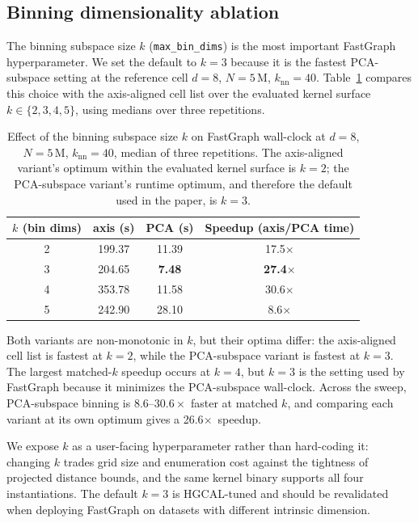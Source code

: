 \documentclass[final,3p,11pt]{elsarticle}
\newcommand{\fgcVanillaBestPCAfactor}{26.6\ensuremath{\times}}
\newcommand{\mbdOptPCA}{3}
\newcommand{\mbdOptAxis}{2}
\newcommand{\mbdPCAdefault}{3}
\begin{document}
\subsection{Binning dimensionality ablation}
\label{sec:mbd-ablation}

The binning subspace size $k$ (\texttt{max\_bin\_dims}) is the most
important FastGraph hyperparameter. We set the default to
$k{=}\mbdPCAdefault$ because it is the fastest PCA-subspace setting at
the reference cell $d{=}8$, $N{=}5$\,M, $k_{\text{nn}}{=}40$.
Table~\ref{tab:mbd-ablation} compares this choice with the
axis-aligned cell list over the evaluated kernel surface
$k \in \{2,3,4,5\}$, using medians over three repetitions.

\begin{table}[!htbp]
\centering
\caption{Effect of the binning subspace size $k$ on FastGraph
wall-clock at $d{=}8$, $N{=}5$\,M, $k_{\text{nn}}{=}40$, median of
three repetitions. The axis-aligned variant's optimum within
the evaluated kernel surface is $k{=}\mbdOptAxis$; the PCA-subspace
variant's runtime optimum, and therefore the default used in the
paper, is $k{=}\mbdOptPCA$.}
\label{tab:mbd-ablation}
\small
\begin{tabular}{cccc}
\toprule
$k$ (bin dims) & axis (s) & PCA (s) & Speedup (axis/PCA time) \\
\midrule
2 & 199.37 & 11.39 & 17.5$\times$ \\
3 & 204.65 &  \textbf{7.48} & \textbf{27.4}$\times$ \\
4 & 353.78 & 11.58 & 30.6$\times$ \\
5 & 242.90 & 28.10 &  8.6$\times$ \\
\bottomrule
\end{tabular}
\end{table}

Both variants are non-monotonic in $k$, but their optima differ: the
axis-aligned cell list is fastest at $k{=}\mbdOptAxis$, while the
PCA-subspace variant is fastest at $k{=}\mbdOptPCA$. The largest
matched-$k$ speedup occurs at $k{=}4$, but $k{=}3$ is the setting used
by FastGraph because it minimizes the PCA-subspace wall-clock. Across
the sweep, PCA-subspace binning is $8.6$--$30.6\times$ faster at
matched $k$, and comparing each variant at its own optimum gives a
\fgcVanillaBestPCAfactor\ speedup.

We expose $k$ as a user-facing hyperparameter rather than hard-coding
it: changing $k$ trades grid size and enumeration cost against the
tightness of projected distance bounds, and the same kernel binary
supports all four instantiations. The default
$k{=}\mbdPCAdefault$ is HGCAL-tuned and should be revalidated when
deploying FastGraph on datasets with different intrinsic dimension.
\end{document}
